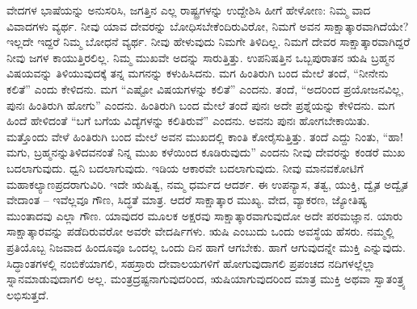 ವೇದಗಳ ಭಾಷೆಯನ್ನು ಅನುಸರಿಸಿ, ಜಗತ್ತಿನ ಎಲ್ಲ ರಾಷ್ಟ್ರಗಳನ್ನು ಉದ್ದೇಶಿಸಿ ಹೀಗೆ ಹೇಳೋಣ: ನಿಮ್ಮ ವಾದ ವಿವಾದಗಳು ವ್ಯರ್ಥ. ನೀವು ಯಾವ ದೇವರನ್ನು ಬೋಧಿಸಬೇಕೆಂದಿರುವಿರೋ, ನಿಮಗೆ ಅವನ ಸಾಕ್ಷಾತ್ಕಾರವಾಗಿದೆಯೇ? ಇಲ್ಲದೇ ಇದ್ದರೆ ನಿಮ್ಮ ಬೋಧನೆ ವ್ಯರ್ಥ. ನೀವು ಹೇಳುವುದು ನಿಮಗೇ ತಿಳಿದಿಲ್ಲ. ನಿಮಗೆ ದೇವರ ಸಾಕ್ಷಾತ್ಕಾರವಾಗಿದ್ದರೆ ನೀವು ಜಗಳ ಕಾಯುತ್ತಿರಲಿಲ್ಲ. ನಿಮ್ಮ ಮುಖವೇ ಅದನ್ನು ಸಾರುತ್ತಿತ್ತು. ಉಪನಿಷತ್ತಿನ ಒಬ್ಬ\break ಪುರಾತನ ಋಷಿ ಬ್ರಹ್ಮನ ವಿಷಯವನ್ನು ತಿಳಿಯುವುದಕ್ಕೆ ತನ್ನ ಮಗನನ್ನು ಕಳುಹಿಸಿದನು. ಮಗ ಹಿಂತಿರುಗಿ ಬಂದ ಮೇಲೆ ತಂದೆ, “ನೀನೇನು ಕಲಿತೆ” ಎಂದು ಕೇಳಿದನು. ಮಗ “ಎಷ್ಟೋ ವಿಷಯಗಳನ್ನು ಕಲಿತೆ” ಎಂದನು. ತಂದೆ, “ಅದರಿಂದ ಪ್ರಯೋಜನವಿಲ್ಲ, ಪುನಃ ಹಿಂತಿರುಗಿ ಹೋಗು” ಎಂದನು. ಹಿಂತಿರುಗಿ ಬಂದ ಮೇಲೆ ತಂದೆ ಪುನಃ ಅದೇ ಪ್ರಶ್ನೆಯನ್ನು ಕೇಳಿದನು. ಮಗ ಹಿಂದೆ ಹೇಳಿದಂತೆ “ಬಗೆ ಬಗೆಯ ವಿದ್ಯೆಗಳನ್ನು ಕಲಿತಿರುವೆ” ಎಂದನು. ಅವನು ಪುನಃ ಹೋಗಬೇಕಾಯಿತು. ಮತ್ತೊಂದು ವೇಳೆ ಹಿಂತಿರುಗಿ ಬಂದ ಮೇಲೆ ಅವನ ಮುಖದಲ್ಲಿ ಕಾಂತಿ ಕೋರೈಸುತ್ತಿತ್ತು. ತಂದೆ ಎದ್ದು ನಿಂತು, “ಹಾ! ಮಗು, ಬ್ರಹ್ಮನನ್ನು\break ತಿಳಿದವನಂತೆ ನಿನ್ನ ಮುಖ ಕಳೆಯಿಂದ ಕೂಡಿರುವುದು” ಎಂದನು ನೀವು ದೇವರನ್ನು ಕಂಡರೆ ಮುಖ ಬದಲಾಗುವುದು. ಧ್ವನಿ ಬದಲಾಗುವುದು. ಇಡಿಯ ಆಕಾರವೇ ಬದಲಾಗುವುದು. ನೀವು ಮಾನವಕೋಟಿಗೆ ಮಹಾಕಲ್ಯಾಣಪ್ರದರಾಗುವಿರಿ. ಇದೇ ಋಷಿತ್ವ, ನಮ್ಮ ಧರ್ಮದ ಆದರ್ಶ. ಈ ಉಪನ್ಯಾಸ, ತತ್ವ, ಯುಕ್ತಿ, ದ್ವೈತ ಅದ್ವೈತ ವೇದಾಂತ – ಇವೆಲ್ಲವೂ ಗೌಣ, ಸಿದ್ಧತೆ ಮಾತ್ರ. ಆದರೆ ಸಾಕ್ಷಾತ್ಕಾರ ಮುಖ್ಯ. ವೇದ, ವ್ಯಾಕರಣ, ಜ್ಯೋತಿಷ್ಯ ಮುಂತಾದವು ಎಲ್ಲಾ ಗೌಣ. ಯಾವುದರ ಮೂಲಕ ಅಕ್ಷರವು ಸಾಕ್ಷಾತ್ಕಾರವಾಗುವುದೋ ಅದೇ ಪರಮಜ್ಞಾನ. ಯಾರು ಸಾಕ್ಷಾತ್ಕಾರವನ್ನು ಪಡೆದಿರುವರೋ ಅವರೇ ವೇದರ್ಷಿಗಳು. ಋಷಿ ಎಂಬುದು ಒಂದು ಅವಸ್ಥೆಯ ಹೆಸರು. ನಮ್ಮಲ್ಲಿ ಪ್ರತಿಯೊಬ್ಬ ನಿಜವಾದ ಹಿಂದೂವೂ ಒಂದಲ್ಲ ಒಂದು ದಿನ ಹಾಗೆ ಆಗಬೇಕು. ಹಾಗೆ ಆಗುವುದನ್ನೇ ಮುಕ್ತಿ ಎನ್ನುವುದು. ಸಿದ್ಧಾಂತಗಳಲ್ಲಿ ನಂಬಿಕೆಯಾಗಲಿ, ಸಹಸ್ರಾರು ದೇವಾಲಯಗಳಿಗೆ ಹೋಗುವುದಾಗಲಿ ಪ್ರಪಂಚದ ನದಿಗಳಲ್ಲೆಲ್ಲಾ ಸ್ನಾನಮಾಡುವುದಾಗಲಿ ಅಲ್ಲ. ಮಂತ್ರದ್ರಷ್ಟನಾಗುವುದರಿಂದ, ಋಷಿಯಾಗುವುದರಿಂದ ಮಾತ್ರ ಮುಕ್ತಿ ಅಥವಾ ಸ್ವಾತಂತ್ರ್ಯ ಲಭಿಸುತ್ತದೆ.

\vskip 2pt

